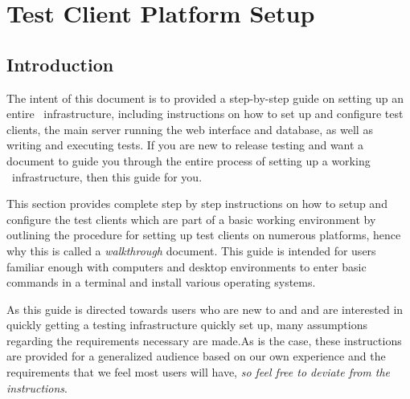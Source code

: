 \chapter{\cernvmreleasetesting Test Client Platform Setup}
\label{sec:testclientsetup}

\section{Introduction}
The intent of this document is to provided a step-by-step guide on setting up an entire \cernvmreleasetesting\ infrastructure, including 
instructions on how to set up and configure test clients, the main server running the web interface and database, as well as writing and 
executing tests. If you are new to release testing and want a document to guide you through the entire process of setting up a working
 \cernvmreleasetesting\ infrastructure, then this guide for you.

This section provides complete step by step instructions on how to setup and configure the test clients which are part of a basic working
\releasetesting environment by outlining the procedure for setting up test clients on numerous platforms, hence why this is called a 
\emph{walkthrough} document. This guide is intended for users familiar enough with computers and desktop environments to enter basic commands
in a terminal and install various operating systems. 

As this guide is directed towards users who are new to \cernvmreleasetesting and \tapper and
are interested in quickly getting a \cernvm testing infrastructure quickly set up, many assumptions regarding the requirements necessary are 
made.As is the case, these instructions are provided for a generalized audience based on our own experience and the requirements that we feel 
most users will have, \emph{so feel free to deviate from the instructions}.